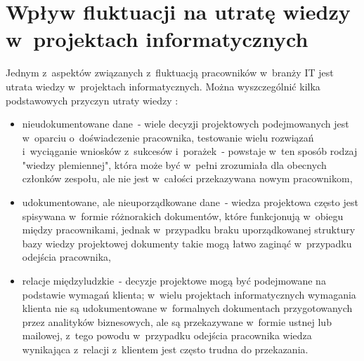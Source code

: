 \begin{minipage}{\textwidth}
\begin{table}[H]
\begin{center}
\begin{tabular}{|P{.2\textwidth}|P{.7\textwidth}|}
                         \hline

                     \end{tabular}
                 \end{center}
                 \raggedright{}
                 \vspace{0.75cm}
             \end{table}
\end{minipage}
%
%
%
%
%


\section{Wpływ fluktuacji na utratę wiedzy w~projektach informatycznych}\label{sec:it-knowledge-loss}

Jednym z~aspektów związanych z~fluktuacją pracowników w~branży IT jest utrata wiedzy w~projektach informatycznych.
Można wyszczególnić kilka podstawowych przyczyn utraty wiedzy \cite{nesh-2021}:
\begin{itemize}
    \item nieudokumentowane dane~- wiele decyzji projektowych podejmowanych jest w~oparciu o~doświadczenie pracownika, testowanie wielu rozwiązań i~wyciąganie wniosków z~sukcesów i~porażek~- powstaje w~ten sposób rodzaj "wiedzy plemiennej", która może być w~pełni zrozumiała dla obecnych członków zespołu, ale nie jest w~całości przekazywana nowym pracownikom,
    \item udokumentowane, ale nieuporządkowane dane~- wiedza projektowa często jest spisywana w~formie różnorakich dokumentów, które funkcjonują w~obiegu między pracownikami, jednak w~przypadku braku uporządkowanej struktury bazy wiedzy projektowej dokumenty takie mogą łatwo zaginąć w~przypadku odejścia pracownika,
    \item relacje międzyludzkie~- decyzje projektowe mogą być podejmowane na podstawie wymagań klienta; w~wielu projektach informatycznych wymagania klienta nie są udokumentowane w~formalnych dokumentach przygotowanych przez analityków biznesowych, ale są przekazywane w~formie ustnej lub mailowej, z~tego powodu w~przypadku odejścia pracownika wiedza wynikająca z~relacji z~klientem jest często trudna do przekazania.
\end{itemize}

